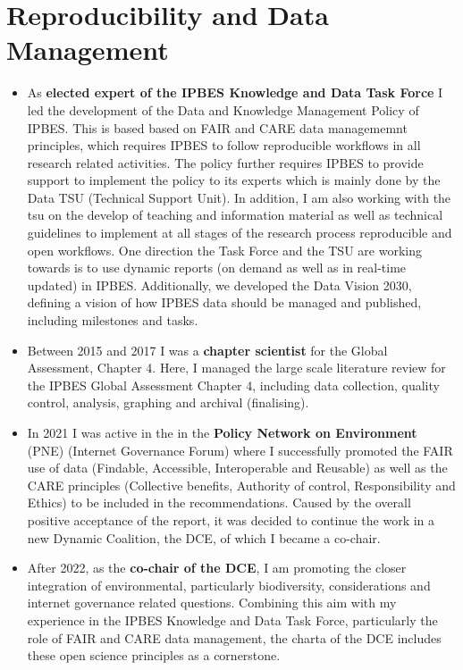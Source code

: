 \documentclass[a4paper]{article}
\begin{document}
\section{Reproducibility and Data Management}
\begin{itemize}[leftmargin=1.1in]

\item As \textbf{elected expert of the IPBES Knowledge and Data Task
	Force} I led the development of the Data and Knowledge Management
	Policy of IPBES. This is based based on FAIR and CARE data
	managememnt principles, which requires IPBES to follow reproducible
	workflows in all research related activities. The policy further
	requires IPBES to provide support to implement the policy to its
	experts which is mainly done by the Data TSU (Technical Support
	Unit). In addition, I am also working with the tsu on the develop of
	teaching and information material as well as technical guidelines to
	implement at all stages of the research process reproducible and open
	workflows. One direction the Task Force and the TSU are working
	towards is to use dynamic reports (on demand as well as in real-time
	updated) in IPBES. Additionally, we developed the Data Vision 2030, 
	defining a vision of how IPBES data should be managed and published, 
	including milestones and tasks. 

\item Between 2015 and 2017 I was a \textbf{chapter scientist} for the
	Global Assessment, Chapter 4. Here, I managed the large scale
	literature review for the IPBES Global Assessment Chapter 4,
	including data collection, quality control, analysis, graphing and
	archival (finalising).

\item In 2021 I was active in the  in the \textbf{Policy Network on
	Environment} (PNE) (Internet Governance Forum) where I successfully
	promoted the FAIR use of data (Findable, Accessible, Interoperable
	and Reusable) as well as the CARE principles (Collective benefits,
	Authority of control, Responsibility and Ethics) to be included in
	the recommendations. Caused by the overall positive acceptance of the
	report, it was decided to continue the work in a new Dynamic
	Coalition, the DCE, of which I became a co-chair.

\item After 2022, as the \textbf{co-chair of the DCE}, I am
	promoting the closer integration of environmental, particularly
	biodiversity, considerations and internet governance related
	questions. Combining this aim with my experience in the IPBES
	Knowledge and Data Task Force, particularly the role of FAIR and CARE
	data management, the charta of the DCE includes these open science
	principles as a cornerstone.

\end{itemize}
\end{document}
